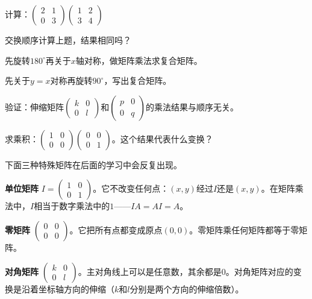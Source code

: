 \documentclass[a4paper,12pt]{ctexart}
\begin{document}
\begin{exercise}[矩阵乘法练习]
\item 计算：$\begin{pmatrix}2&1\\0&3\end{pmatrix}\begin{pmatrix}1&2\\3&4\end{pmatrix}$
\item 交换顺序计算上题，结果相同吗？
\item 先旋转$180^\circ$再关于$x$轴对称，做矩阵乘法求复合矩阵。
\item 先关于$y=x$对称再旋转$90^\circ$，写出复合矩阵。
\item 验证：伸缩矩阵$\begin{pmatrix}k&0\\0&l\end{pmatrix}$和$\begin{pmatrix}p&0\\0&q\end{pmatrix}$的乘法结果与顺序无关。
\item 求乘积：$\begin{pmatrix}1&0\\0&0\end{pmatrix}\begin{pmatrix}0&0\\0&1\end{pmatrix}$。这个结果代表什么变换？
\end{exercise}



下面三种特殊矩阵在后面的学习中会反复出现。

\textbf{单位矩阵} $I=\begin{pmatrix}1&0\\0&1\end{pmatrix}$。它不改变任何点：$(x,y)$经过$I$还是$(x,y)$。在矩阵乘法中，$I$相当于数字乘法中的$1$——$IA=AI=A$。

\textbf{零矩阵} $\begin{pmatrix}0&0\\0&0\end{pmatrix}$。它把所有点都变成原点$(0,0)$。零矩阵乘任何矩阵都等于零矩阵。

\textbf{对角矩阵} $\begin{pmatrix}k&0\\0&l\end{pmatrix}$。主对角线上可以是任意数，其余都是$0$。对角矩阵对应的变换是沿着坐标轴方向的伸缩（$k$和$l$分别是两个方向的伸缩倍数）。
\end{document}
